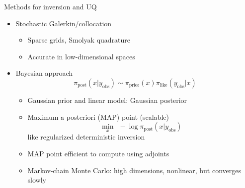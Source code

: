\documentclass{beamer}
\begin{document}
\begin{frame}{Methods for inversion and UQ}
  \begin{itemize}
  \item Stochastic Galerkin/collocation
    \begin{itemize}
    \item Sparse grids, Smolyak quadrature
    \item Accurate in low-dimensional spaces
    \end{itemize}
  \item Bayesian approach
    \begin{equation*}
      \pi_{\text{post}}(x | y_{\text{obs}}) \sim \pi_{\text{prior}} (x) \pi_{\text{like}}(y_{\text{obs}}| x)
    \end{equation*}
    \begin{itemize}
    \item Gaussian prior and linear model: Gaussian posterior
    \item Maximum a posteriori (MAP) point (scalable)
      \begin{equation*}
        \min_{x} \ \ - \log \pi_{\text{post}}(x | y_{\text{obs}})
      \end{equation*}
      like regularized deterministic inversion
    \item MAP point efficient to compute using adjoints
    \item Markov-chain Monte Carlo: high dimensions, nonlinear, but converges slowly
    \end{itemize}
  \end{itemize}
\end{frame}
\end{document}
